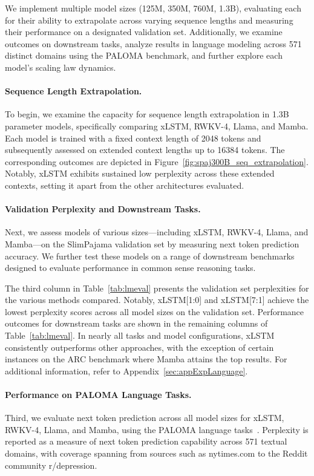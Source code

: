We implement multiple model sizes (125M, 350M, 760M, 1.3B), evaluating each for their ability to extrapolate across varying sequence lengths and measuring their performance on a designated validation set. Additionally, we examine outcomes on downstream tasks, analyze results in language modeling across 571 distinct domains using the PALOMA benchmark, and further explore each model’s scaling law dynamics.

\paragraph{Sequence Length Extrapolation.}
\label{sec:spaj300B_ctx_extrapolation}
To begin, we examine the capacity for sequence length extrapolation in 1.3B parameter models, specifically comparing xLSTM, RWKV-4, Llama, and Mamba. Each model is trained with a fixed context length of 2048 tokens and subsequently assessed on extended context lengths up to 16384 tokens. The corresponding outcomes are depicted in Figure~\ref{fig:spaj300B_seq_extrapolation}. Notably, xLSTM exhibits sustained low perplexity across these extended contexts, setting it apart from the other architectures evaluated.

\paragraph{Validation Perplexity and Downstream Tasks.}
\label{sec:spaj_downstream_eval}
Next, we assess models of various sizes—including xLSTM, RWKV-4, Llama, and Mamba—on the SlimPajama validation set by measuring next token prediction accuracy. We further test these models on a range of downstream benchmarks designed to evaluate performance in common sense reasoning tasks.

The third column in Table~\ref{tab:lmeval} presents the validation set perplexities for the various methods compared. Notably, xLSTM[1:0] and xLSTM[7:1] achieve the lowest perplexity scores across all model sizes on the validation set. Performance outcomes for downstream tasks are shown in the remaining columns of Table~\ref{tab:lmeval}. In nearly all tasks and model configurations, xLSTM consistently outperforms other approaches, with the exception of certain instances on the ARC benchmark where Mamba attains the top results. For additional information, refer to Appendix~\ref{sec:appExpLanguage}.

\paragraph{Performance on PALOMA Language Tasks.} Third, we evaluate next token prediction across all model sizes for xLSTM, RWKV-4, Llama, and Mamba, using the PALOMA language tasks~\citep{Magnusson:23arxivshort}. Perplexity is reported as a measure of next token prediction capability across 571 textual domains, with coverage spanning from sources such as nytimes.com to the Reddit community r/depression.

